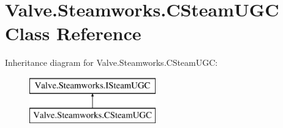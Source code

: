 \hypertarget{classValve_1_1Steamworks_1_1CSteamUGC}{}\section{Valve.\+Steamworks.\+C\+Steam\+U\+G\+C Class Reference}
\label{classValve_1_1Steamworks_1_1CSteamUGC}
Inheritance diagram for Valve.\+Steamworks.\+C\+Steam\+U\+G\+C\+:\begin{figure}[H]
\begin{center}
\leavevmode
\includegraphics[height=2.000000cm]{classValve_1_1Steamworks_1_1CSteamUGC}
\end{center}
\end{figure}
